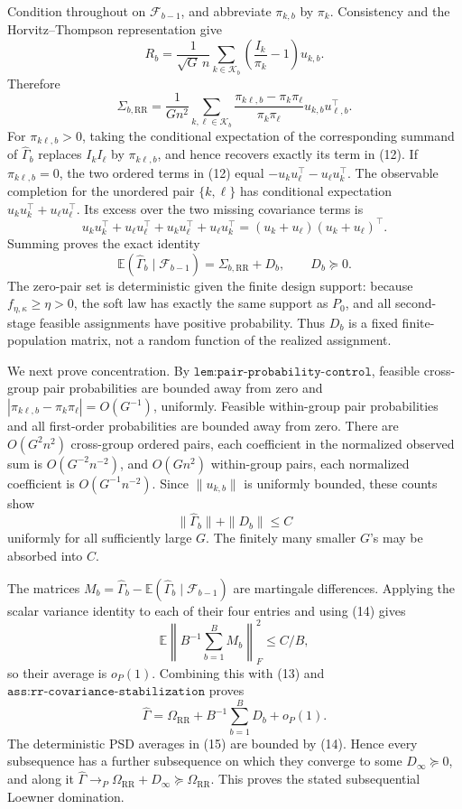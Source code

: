 Condition throughout on \(\mathcal F_{b-1}\), and abbreviate \(\pi_{k,b}\) by \(\pi_k\).  Consistency and the Horvitz--Thompson representation give
\[
 R_b=\frac1{\sqrt G\,n}\sum_{k\in\mathcal K_b}
       \left(\frac{I_k}{\pi_k}-1\right)u_{k,b}.
\]
Therefore
\[
 \Sigma_{b,\mathrm{RR}}
 =\frac1{Gn^2}\sum_{k,\ell\in\mathcal K_b}
   \frac{\pi_{k\ell,b}-\pi_k\pi_\ell}{\pi_k\pi_\ell}
   u_{k,b}u_{\ell,b}^\top.                                  \tag{12}
\]
For \(\pi_{k\ell,b}>0\), taking the conditional expectation of the corresponding summand of \(\widehat\Gamma_b\) replaces \(I_kI_\ell\) by \(\pi_{k\ell,b}\), and hence recovers exactly its term in (12).  If \(\pi_{k\ell,b}=0\), the two ordered terms in (12) equal
\(-u_ku_\ell^\top-u_\ell u_k^\top\).  The observable completion for the unordered pair \(\{k,\ell\}\) has conditional expectation
\(u_ku_k^\top+u_\ell u_\ell^\top\).  Its excess over the two missing covariance terms is
\[
 u_ku_k^\top+u_\ell u_\ell^\top+u_ku_\ell^\top+u_\ell u_k^\top
 =(u_k+u_\ell)(u_k+u_\ell)^\top.
\]
Summing proves the exact identity
\[
 \mathbb E(\widehat\Gamma_b\mid\mathcal F_{b-1})
 =\Sigma_{b,\mathrm{RR}}+D_b,
 \qquad D_b\succeq0.                                      \tag{13}
\]
The zero-pair set is deterministic given the finite design support: because \(f_{\eta,\kappa}\geq\eta>0\), the soft law has exactly the same support as \(P_0\), and all second-stage feasible assignments have positive probability.  Thus \(D_b\) is a fixed finite-population matrix, not a random function of the realized assignment.

We next prove concentration.  By \(\texttt{lem:pair-probability-control}\), feasible cross-group pair probabilities are bounded away from zero and
\(|\pi_{k\ell,b}-\pi_k\pi_\ell|=O(G^{-1})\), uniformly.  Feasible within-group pair probabilities and all first-order probabilities are bounded away from zero.  There are \(O(G^2n^2)\) cross-group ordered pairs, each coefficient in the normalized observed sum is \(O(G^{-2}n^{-2})\), and \(O(Gn^2)\) within-group pairs, each normalized coefficient is \(O(G^{-1}n^{-2})\).  Since \(\|u_{k,b}\|\) is uniformly bounded, these counts show
\[
 \|\widehat\Gamma_b\|+\|D_b\|\leq C                              \tag{14}
\]
uniformly for all sufficiently large \(G\).  The finitely many smaller \(G\)'s may be absorbed into \(C\).

The matrices
\(M_b=\widehat\Gamma_b-\mathbb E(\widehat\Gamma_b\mid\mathcal F_{b-1})\)
are martingale differences.  Applying the scalar variance identity to each of their four entries and using (14) gives
\[
 \mathbb E\left\|B^{-1}\sum_{b=1}^BM_b\right\|_F^2\leq C/B,
\]
so their average is \(o_P(1)\).  Combining this with (13) and \(\texttt{ass:rr-covariance-stabilization}\) proves
\[
 \widehat\Gamma
 =\Omega_{\mathrm{RR}}+B^{-1}\sum_{b=1}^BD_b+o_P(1).           \tag{15}
\]
The deterministic PSD averages in (15) are bounded by (14).  Hence every subsequence has a further subsequence on which they converge to some \(D_\infty\succeq0\), and along it \(\widehat\Gamma\to_P\Omega_{\mathrm{RR}}+D_\infty\succeq\Omega_{\mathrm{RR}}\).  This proves the stated subsequential Loewner domination.

